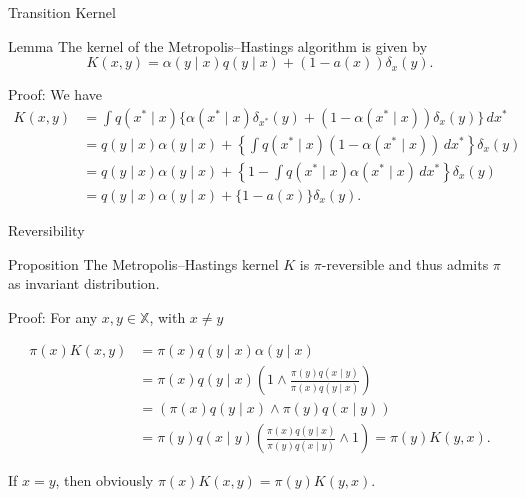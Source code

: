 \documentclass[aspectratio=169]{beamer}
\begin{document}
\begin{frame}{Transition Kernel}
	\begin{block}{Lemma}
		The kernel of the Metropolis--Hastings algorithm is given by
		\[
			K(x, y) = \alpha(y \mid x)q(y \mid x) + (1 - a(x))\delta_x(y).
		\]
	\end{block}

	Proof:
	We have
	\begin{align*}
		K(x,y)
		 & = \int q(x^* \mid x)\{\alpha(x^* \mid x)\delta_{x^*}(y) + (1 - \alpha(x^* \mid x))\delta_x(y)\}\,dx^*      \\
		 & = q(y \mid x)\alpha(y \mid x) + \left\{\int q(x^* \mid x)(1 - \alpha(x^* \mid x))\,dx^*\right\}\delta_x(y) \\
		 & = q(y \mid x)\alpha(y \mid x) + \left\{1 - \int q(x^* \mid x)\alpha(x^* \mid x)\,dx^*\right\}\delta_x(y)   \\
		 & = q(y \mid x)\alpha(y \mid x) + \{1 - a(x)\}\delta_x(y).
	\end{align*}

\end{frame}

\begin{frame}{Reversibility}
	\begin{block}{Proposition}
		The Metropolis--Hastings kernel $K$ is $\pi$-reversible and thus admits $\pi$ as invariant distribution.
	\end{block}

	Proof:
	For any $x, y \in \mathbb{X}$, with $x \neq y$

	\begin{align*}
		\pi(x)K(x, y) & = \pi(x)q(y \mid x)\alpha(y \mid x)                                                                    \\
		              & = \pi(x)q(y \mid x) \left(1 \wedge \frac{\pi(y)q(x \mid y)}{\pi(x)q(y \mid x)}\right)                  \\
		              & = \left(\pi(x)q(y \mid x) \wedge \pi(y)q(x \mid y)\right)                                              \\
		              & = \pi(y)q(x \mid y) \left(\frac{\pi(x)q(y \mid x)}{\pi(y)q(x \mid y)} \wedge 1\right) = \pi(y)K(y, x).
	\end{align*}

	If $x = y$, then obviously $\pi(x)K(x, y) = \pi(y)K(y, x)$.

\end{frame}
\end{document}
